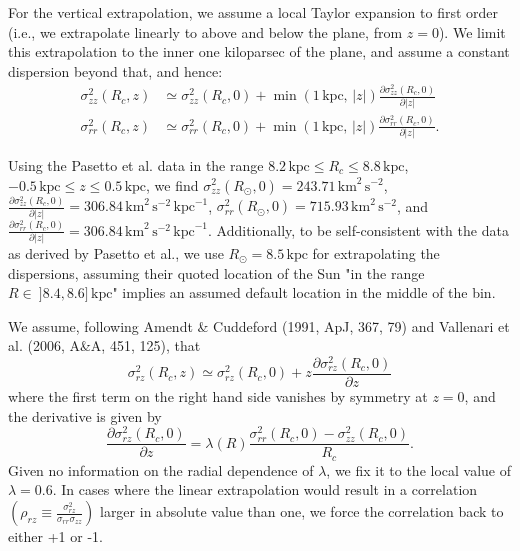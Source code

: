 \documentclass[fleqn,usenatbib]{mnras}
\begin{document}
For the vertical extrapolation, we assume a local Taylor expansion to first order (i.e., we extrapolate linearly to above and below the plane, from $z = 0$).
We limit this extrapolation to the inner one kiloparsec of the plane, and assume a constant dispersion beyond that, and hence:
\begin{align}
    \sigma_{zz}^2(R_c, z) &\simeq \sigma_{zz}^2(R_c, 0) + \min\left(1\,\mathrm{kpc},\,\lvert z \lvert\right) \frac{\partial \sigma_{zz}^2(R_c, 0)}{\partial \lvert z \lvert} \\
    \sigma_{rr}^2(R_c, z) &\simeq \sigma_{rr}^2(R_c, 0) + \min\left(1\,\mathrm{kpc},\,\lvert z \lvert\right) \frac{\partial \sigma_{rr}^2(R_c, 0)}{\partial \lvert z \lvert}.
\end{align}

Using the Pasetto et al. data in the range $8.2\,\mathrm{kpc} \leq R_c \leq 8.8\,\mathrm{kpc}$, $-0.5\,\mathrm{kpc} \leq z \leq 0.5\,\mathrm{kpc}$, we find $\sigma_{zz}^2(R_\odot, 0) = 243.71\,\mathrm{km}^2\,\mathrm{s}^{-2}$, $\frac{\partial \sigma_{zz}^2(R_c, 0)}{\partial \lvert z \lvert} = 306.84\,\mathrm{km}^2\,\mathrm{s}^{-2}\,\mathrm{kpc}^{-1}$, $\sigma_{rr}^2(R_\odot, 0) = 715.93\,\mathrm{km}^2\,\mathrm{s}^{-2}$, and $\frac{\partial \sigma_{rr}^2(R_c, 0)}{\partial \lvert z \lvert} = 306.84\,\mathrm{km}^2\,\mathrm{s}^{-2}\,\mathrm{kpc}^{-1}$.
Additionally, to be self-consistent with the data as derived by Pasetto et al., we use $R_\odot = 8.5\,\mathrm{kpc}$ for extrapolating the dispersions, assuming their quoted location of the Sun "in the range $R \in\ ]8.4, 8.6]\,\mathrm{kpc}$" implies an assumed default location in the middle of the bin.

We assume, following Amendt \& Cuddeford (1991, ApJ, 367, 79) and Vallenari et al. (2006, A\&A, 451, 125), that
\begin{equation}
    \sigma_{rz}^2(R_c, z) \simeq \sigma_{rz}^2(R_c, 0) + z \frac{\partial \sigma_{rz}^2(R_c, 0)}{\partial z}
\end{equation}
where the first term on the right hand side vanishes by symmetry at $z=0$, and the derivative is given by
\begin{equation}
    \frac{\partial \sigma_{rz}^2(R_c, 0)}{\partial z} = \lambda(R)\frac{\sigma_{rr}^2(R_c, 0) - \sigma_{zz}^2(R_c, 0)}{R_c}.
\end{equation}
Given no information on the radial dependence of $\lambda$, we fix it to the local value of $\lambda = 0.6$.
In cases where the linear extrapolation would result in a correlation $\left(\rho_{rz} \equiv \frac{\sigma_{rz}^2}{\sigma_{rr}\sigma_{zz}}\right)$ larger in absolute value than one, we force the correlation back to either +1 or -1.
\end{document}
